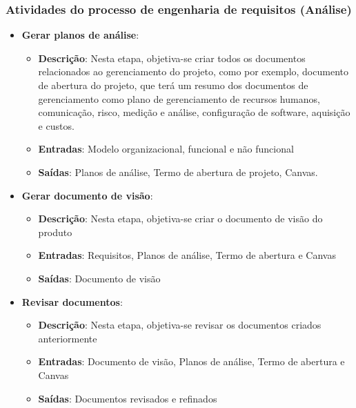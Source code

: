 \subsubsection{Atividades do processo de engenharia de requisitos (Análise)}

\begin{itemize}
  \item \textbf{Gerar planos de análise}:
  \begin{itemize}
    \item \textbf{Descrição}: Nesta etapa, objetiva-se criar todos os documentos relacionados ao gerenciamento do
      projeto, como por exemplo, documento de abertura do projeto, que terá um resumo dos documentos de gerenciamento
      como plano de gerenciamento de recursos humanos, comunicação, risco, medição e análise, configuração de
      software, aquisição e custos.
    \item \textbf{Entradas}: Modelo organizacional, funcional e não funcional
    \item \textbf{Saídas}: Planos de análise, Termo de abertura de projeto, Canvas.
  \end{itemize}
  \item \textbf{Gerar documento de visão}:
  \begin{itemize}
    \item \textbf{Descrição}: Nesta etapa, objetiva-se criar o documento de visão do produto
    \item \textbf{Entradas}: Requisitos, Planos de análise, Termo de abertura e Canvas
    \item \textbf{Saídas}: Documento de visão
  \end{itemize}
  \item \textbf{Revisar documentos}:
  \begin{itemize}
    \item \textbf{Descrição}: Nesta etapa, objetiva-se revisar os documentos criados anteriormente
    \item \textbf{Entradas}: Documento de visão, Planos de análise, Termo de abertura e Canvas
    \item \textbf{Saídas}: Documentos revisados e refinados
  \end{itemize}
\end{itemize}
